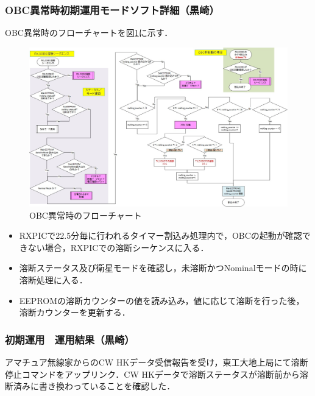 \subsubsection{OBC異常時初期運用モードソフト詳細（黒崎）}
OBC異常時のフローチャートを図\ref{fig3-4-Ini-2}に示す．
\begin{figure}[H]
	\centering
	\includegraphics[scale=0.6]{03/fig/3-4-Ini-2.jpg}
	\caption{OBC異常時のフローチャート}
	\label{fig3-4-Ini-2}
\end{figure}	
\begin{itemize}
	\item RXPICで22.5分毎に行われるタイマー割込み処理内で，OBCの起動が確認できない場合，RXPICでの溶断シーケンスに入る．
	\item 溶断ステータス及び衛星モードを確認し，未溶断かつNominalモードの時に溶断処理に入る．
	\item EEPROMの溶断カウンターの値を読み込み，値に応じて溶断を行った後，溶断カウンターを更新する．
\end{itemize}

\subsubsection{初期運用　運用結果（黒崎）}
アマチュア無線家からのCW HKデータ受信報告を受け，東工大地上局にて溶断停止コマンドをアップリンク．CW HKデータで溶断ステータスが溶断前から溶断済みに書き換わっていることを確認した．

